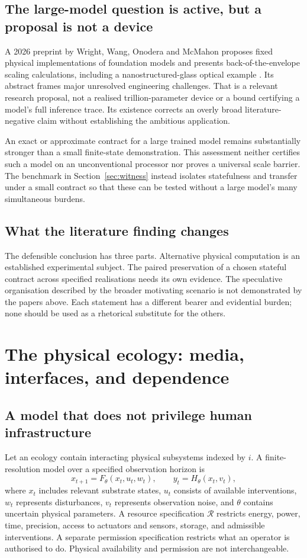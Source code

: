 \documentclass[11pt,a4paper]{article}
\theoremstyle{definition}
\theoremstyle{remark}
\newcommand{\calR}{\mathcal{R}}
\begin{document}
\subsection{The large-model question is active, but a proposal is not a device}
A 2026 preprint by Wright, Wang, Onodera and McMahon proposes fixed physical implementations of foundation models and presents back-of-the-envelope scaling calculations, including a nanostructured-glass optical example \citep{pfm}. Its abstract frames major unresolved engineering challenges. That is a relevant research proposal, not a realised trillion-parameter device or a bound certifying a model's full inference trace. Its existence corrects an overly broad literature-negative claim without establishing the ambitious application.

An exact or approximate contract for a large trained model remains substantially stronger than a small finite-state demonstration. This assessment neither certifies such a model on an unconventional processor nor proves a universal scale barrier. The benchmark in Section~\ref{sec:witness} instead isolates statefulness and transfer under a small contract so that these can be tested without a large model's many simultaneous burdens.

\subsection{What the literature finding changes}
The defensible conclusion has three parts. Alternative physical computation is an established experimental subject. The paired preservation of a chosen stateful contract across specified realisations needs its own evidence. The speculative organisation described by the broader motivating scenario is not demonstrated by the papers above. Each statement has a different bearer and evidential burden; none should be used as a rhetorical substitute for the others.


\section{The physical ecology: media, interfaces, and dependence}\label{sec:ecology}
\subsection{A model that does not privilege human infrastructure}
Let an ecology contain interacting physical subsystems indexed by $i$. A finite-resolution model over a specified observation horizon is
\begin{equation}\label{eq:ecology}
 x_{t+1}=F_\theta(x_t,u_t,w_t),\qquad y_t=H_\theta(x_t,v_t),
\end{equation}
where $x_t$ includes relevant substrate states, $u_t$ consists of available interventions, $w_t$ represents disturbances, $v_t$ represents observation noise, and $\theta$ contains uncertain physical parameters. A resource specification $\calR$ restricts energy, power, time, precision, access to actuators and sensors, storage, and admissible interventions. A separate permission specification restricts what an operator is authorised to do. Physical availability and permission are not interchangeable.
\end{document}
